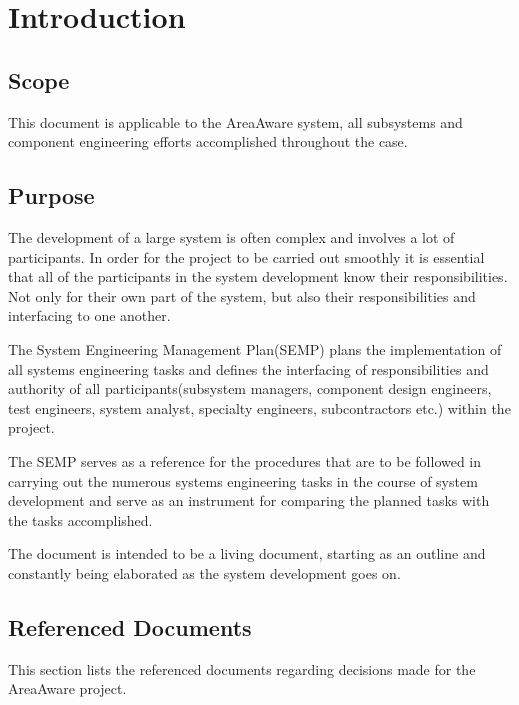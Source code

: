 %
\thispagestyle{fancy}
\chapter{Introduction}
\label{chp:intro}


\section{Scope}
This document is applicable to the AreaAware system, all subsystems and component engineering efforts accomplished throughout the case.

\section{Purpose}
The development of a large system is often complex and involves a lot of participants.
In order for the project to be carried out smoothly it is essential that all of the participants in the system development know their responsibilities.
Not only for their own part of the system, but also their responsibilities and interfacing to one another.

The System Engineering Management Plan(SEMP) plans the implementation of all systems engineering tasks and defines the interfacing of responsibilities and authority of all participants(subsystem managers, component design engineers, test engineers, system analyst, specialty engineers, subcontractors etc.) within the project.

The SEMP serves as a reference for the procedures that are to be followed in carrying out the numerous systems engineering tasks in the course of system development and serve as an instrument for comparing the planned tasks with the tasks accomplished.

The document is intended to be a living document, starting as an outline and constantly being elaborated as the system development goes on.

\section{Referenced Documents}
This section lists the referenced documents regarding decisions made for the AreaAware project.


